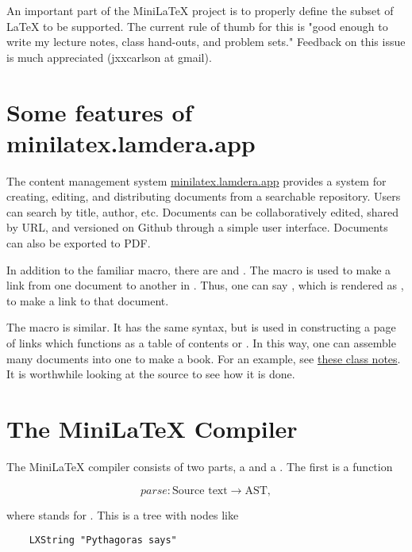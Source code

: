  An important part of the MiniLaTeX project is to properly define the subset of LaTeX to be supported.  The current rule of thumb for this is "good enough to write my lecture notes, class hand-outs, and problem sets."  Feedback on this issue is much appreciated (jxxcarlson at gmail).


\section{Some features of minilatex.lamdera.app}

The content management system \href{https://minilatex.lamdera.app}{minilatex.lamdera.app} provides a system for creating, editing, and distributing documents from a searchable repository.  Users can search by title, author, etc.  Documents can be collaboratively edited, shared by URL, and versioned on Github through a simple user interface.  Documents can also be exported to PDF.


In addition to the familiar  macro, there are   and .  The  macro
is used to make a link from one document to another in .   Thus, one can say
, which is rendered as , to make a link to that document.

The  macro is similar.  It has the same syntax, but is used in constructing a page of links which functions as a table of contents or . In this way, one can assemble many documents into one to make a book.  For an example, see \href{https://minilatex.lamdera.app/g/34}{these class notes}. It is worthwhile looking at the source to see how it is done.





\section{The MiniLaTeX Compiler}

The MiniLaTeX compiler consists of two parts, a  and a .  The first is a function

$$
parse: \text{Source text} \to \text{AST},
$$

where  stands for .  This is a tree with nodes like

\begin{verbatim}
    LXString "Pythagoras says"
\end{verbatim}

